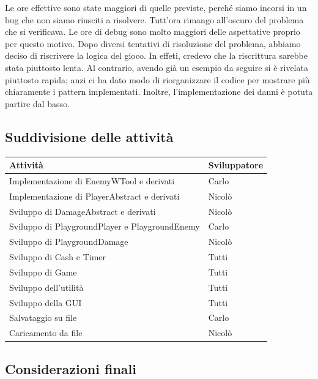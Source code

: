 \documentclass[11pt]{article}
\begin{document}
Le ore effettive sono state maggiori di quelle previste, perché siamo incorsi in
un bug che non siamo riusciti a risolvere. Tutt'ora rimango all'oscuro del
problema che si verificava. Le ore di debug sono molto maggiori delle 
aspettative proprio per questo motivo. Dopo diversi tentativi di risoluzione 
del problema,
abbiamo deciso di riscrivere la logica del gioco. In effeti, credevo che la
riscrittura sarebbe stata piuttosto lenta. Al contrario, avendo già un esempio
da seguire si è rivelata piuttosto rapida; anzi ci ha dato modo di riorganizzare
il codice per mostrare più chiaramente i pattern implementati. Inoltre,
l'implementazione dei danni è potuta partire dal basso.

\subsection{Suddivisione delle attività}

\begin{table}[H]
	\centering
	\begin{tabular}{|l|l|}
		\hline
		\textbf{Attività} & \textbf{Sviluppatore} \\
		\hline
		Implementazione di EnemyWTool e derivati & Carlo \\ \hline
		Implementazione di PlayerAbstract e derivati & Nicolò \\ \hline
		Sviluppo di DamageAbstract e derivati & Nicolò \\ \hline
		Sviluppo di PlaygroundPlayer e PlaygroundEnemy & Carlo \\ \hline
		Sviluppo di PlaygroundDamage & Nicolò \\ \hline
		Sviluppo di Cash e Timer & Tutti \\ \hline
		Sviluppo di Game & Tutti \\ \hline
		Sviluppo dell'utilità & Tutti \\ \hline
		Sviluppo della GUI & Tutti \\ \hline
		Salvataggio su file & Carlo \\ \hline
		Caricamento da file & Nicolò \\ \hline
	\end{tabular}
\end{table}

\subsection{Considerazioni finali}
\end{document}
